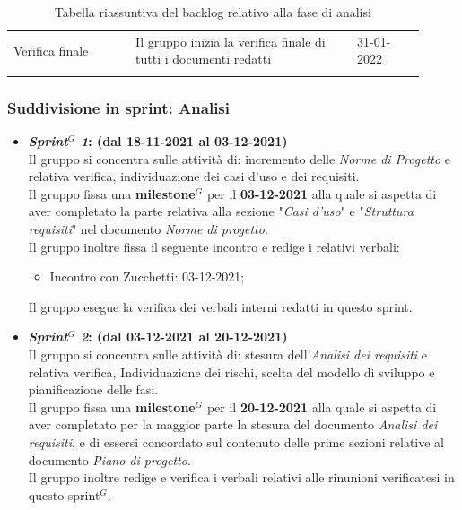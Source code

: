 {\begin{longtable}{p{0.27\linewidth}p{0.49\linewidth}p{0.15\linewidth}}
    \rowcolor[RGB]{233, 245, 206}
    Verifica finale & Il gruppo inizia la verifica finale di tutti i documenti redatti & 31-01-2022\\

    \caption{Tabella riassuntiva del backlog relativo alla fase di analisi}
\end{longtable}	
}

\subsubsection{Suddivisione in sprint: Analisi}
\begin{itemize}
    \item \textbf{\textit{Sprint$^{G}$ 1}: (dal 18-11-2021 al 03-12-2021)}\\
    Il gruppo si concentra sulle attività di: incremento delle \textit{Norme di Progetto} e relativa verifica, individuazione dei casi d'uso e dei requisiti.\\
    Il gruppo fissa una \textbf{milestone$^{G}$} per il \textbf{03-12-2021} alla quale si aspetta di aver completato la parte relativa alla sezione "\textit{Casi d'uso}" e "\textit{Struttura requisiti}" nel documento \textit{Norme di progetto}.\\
    Il gruppo inoltre fissa il seguente incontro e redige i relativi verbali:
    \begin{itemize}
        \item Incontro con Zucchetti: 03-12-2021;
    \end{itemize} 
    Il gruppo esegue la verifica dei verbali interni redatti in questo sprint.

    \item \textbf{\textit{Sprint$^{G}$ 2}: (dal 03-12-2021 al 20-12-2021)}\\
    Il gruppo si concentra sulle attività di: stesura dell'\textit{Analisi dei requisiti} e relativa verifica, Individuazione dei rischi, scelta del modello di sviluppo e pianificazione delle fasi.\\
    Il gruppo fissa una \textbf{milestone$^{G}$} per il \textbf{20-12-2021} alla quale si aspetta di aver completato per la maggior parte la stesura del documento \textit{Analisi dei requisiti}, e di essersi concordato sul contenuto delle prime sezioni relative al documento \textit{Piano di progetto}.\\
    Il gruppo inoltre redige e verifica i verbali relativi alle rinunioni verificatesi in questo sprint$^{G}$.


\end{itemize}
